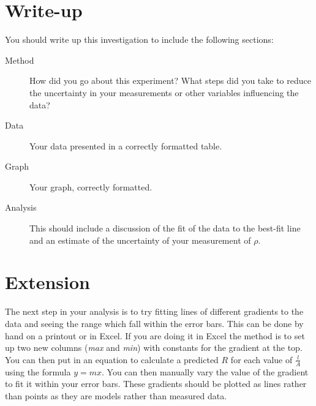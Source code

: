 \documentclass[11pt]{article}
\begin{document}
\begin{adjustwidth}{0cm}{0.4\textwidth}
\section{Write-up}
You should write up this investigation to include the following sections:
\begin{description}
    \item[Method] How did you go about this experiment?  What steps did you take to reduce the uncertainty in your measurements or other variables influencing the data?
    \item[Data] Your data presented in a correctly formatted table.
    \item[Graph] Your graph, correctly formatted.
    \item[Analysis] This should include a discussion of the fit of the data to the best-fit line and an estimate of the uncertainty of your measurement of $\rho$.
\end{description}

\section*{Extension}
The next step in your analysis is to try fitting lines of different gradients to the data and seeing the range which fall within the error bars.  This can be done by hand on a printout or in Excel.  If you are doing it in Excel the method is to set up two new columns (\emph{max} and \emph{min}) with constants for the gradient at the top.  You can then put in an equation to calculate a predicted $R$ for each value of $\frac{l}{A}$ using the formula $y=mx$.  You can then manually vary the value of the gradient to fit it within your error bars.  These gradients should be plotted as lines rather than points as they are models rather than measured data.


\end{adjustwidth}
\end{document}
